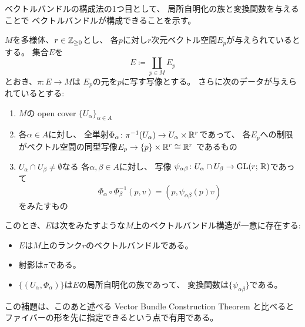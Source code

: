 \documentclass[report]{jlreq}
\begin{document}
ベクトルバンドルの構成法の1つ目として、
局所自明化の族と変換関数を与えることで
ベクトルバンドルが構成できることを示す。

\begin{lemma}
    $M$を多様体、$r \in \mathbb{Z}_{\ge 0}$とし、
    各$p$に対し$r$次元ベクトル空間$E_p$が与えられているとする。
    集合$E$を
    \begin{equation}
        E \coloneqq \coprod_{p \in M} E_p
    \end{equation}
    とおき、$\pi \colon E \to M$は
    $E_p$の元を$p$に写す写像とする。
    さらに次のデータが与えられているとする:
    \begin{enumerate}
        \item $M$の open cover $\{U_\alpha\}_{\alpha \in A}$
        \item 各$\alpha \in A$に対し、
            全単射$\Phi_\alpha \colon \pi^{-1}(U_\alpha) \to U_\alpha \times \mathbb{R}^r$であって、
            各$E_p$への制限がベクトル空間の同型写像$E_p \to \{ p \} \times \mathbb{R}^r \cong \mathbb{R}^r$
            であるもの
        \item $U_\alpha \cap U_\beta \neq \emptyset$なる
            各$\alpha, \beta \in A$に対し、
            {\smooth}写像
            $\psi_{\alpha \beta} \colon U_\alpha \cap U_\beta \to \operatorname{\mathrm{GL}}(r;\, \mathbb{R})$であって
            \begin{equation}
                \Phi_\alpha \circ \Phi_\beta^{-1} (p, v)
                    = (p, \psi_{\alpha \beta}(p) v)
            \end{equation}
            をみたすもの
    \end{enumerate}
    このとき、$E$は次をみたすような$M$上のベクトルバンドル構造が一意に存在する:
    \begin{itemize}
        \item $E$は$M$上のランク$r$のベクトルバンドルである。
        \item 射影は$\pi$である。
        \item $\{(U_\alpha, \Phi_\alpha)\}$は$E$の局所自明化の族であって、
            変換関数は$\{ \psi_{\alpha \beta} \}$である。
    \end{itemize}
\end{lemma}

\begin{remark}
    この補題は、このあと述べる Vector Bundle Construction Theorem と比べると
    ファイバーの形を先に指定できるという点で有用である。
\end{remark}
\end{document}
